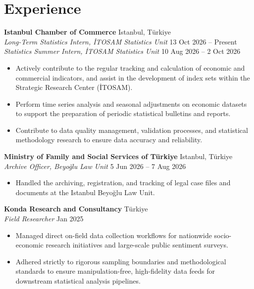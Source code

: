 \documentclass[10pt,a4paper]{extarticle}
\begin{document}
\section{Experience}
\textbf{Istanbul Chamber of Commerce} \hfill Istanbul, Türkiye\\
\textit{Long-Term Statistics Intern, İTOSAM Statistics Unit} \hfill 13 Oct 2026 -- Present\\
\textit{Statistics Summer Intern, İTOSAM Statistics Unit} \hfill 10 Aug 2026 -- 2 Oct 2026
\begin{itemize}[leftmargin=*,noitemsep,topsep=2pt]
    \item Actively contribute to the regular tracking and calculation of economic and commercial indicators, and assist in the development of index sets within the Strategic Research Center (İTOSAM).
    \item Perform time series analysis and seasonal adjustments on economic datasets to support the preparation of periodic statistical bulletins and reports.
    \item Contribute to data quality management, validation processes, and statistical methodology research to ensure data accuracy and reliability.
\end{itemize}

\textbf{Ministry of Family and Social Services of Türkiye} \hfill Istanbul, Türkiye\\
\textit{Archive Officer, Beyoğlu Law Unit} \hfill 5 Jun 2026 -- 7 Aug 2026
\begin{itemize}[leftmargin=*,noitemsep,topsep=2pt]
    \item Handled the archiving, registration, and tracking of legal case files and documents at the Istanbul Beyoğlu Law Unit.
\end{itemize}

\textbf{Konda Research and Consultancy} \hfill Türkiye\\
\textit{Field Researcher} \hfill Jan 2025
\begin{itemize}[leftmargin=*,noitemsep,topsep=2pt]
    \item Managed direct on-field data collection workflows for nationwide socio-economic research initiatives and large-scale public sentiment surveys.
    \item Adhered strictly to rigorous sampling boundaries and methodological standards to ensure manipulation-free, high-fidelity data feeds for downstream statistical analysis pipelines.
\end{itemize}
\end{document}
